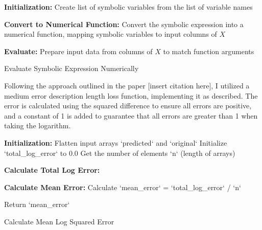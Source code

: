 \documentclass{article}
\begin{document}
\begin{algorithm}[H]
\SetAlgoLined
{}

\textbf{Initialization:}\;
Create list of symbolic variables from the list of variable names\;

\textbf{Convert to Numerical Function:}\;
Convert the symbolic expression into a numerical function, mapping symbolic variables to input columns of \(X\)\;

\textbf{Evaluate:}\;
Prepare input data from columns of \(X\) to match function arguments\;

\caption{Evaluate Symbolic Expression Numerically}
\label{alg:evaluate_expression} %
\end{algorithm}





Following the approach outlined in the paper [insert citation here], I utilized a medium error description length loss function, implementing it as described. The error is calculated using the squared difference to ensure all errors are positive, and a constant of 1 is added to guarantee that all errors are greater than 1 when taking the logarithm.\\




\begin{algorithm}[H]
\SetAlgoLined
{}

\textbf{Initialization:}\;
Flatten input arrays `predicted` and `original`\;
Initialize `total_log_error` to 0.0\;
Get the number of elements `n` (length of arrays)\;

\textbf{Calculate Total Log Error:}\;

\textbf{Calculate Mean Error:}\;
Calculate `mean_error` = `total_log_error` / `n`\;

Return `mean_error`\;

\caption{Calculate Mean Log Squared Error}
\label{alg:mean_log_squared_error} %
\end{algorithm}
\end{document}
